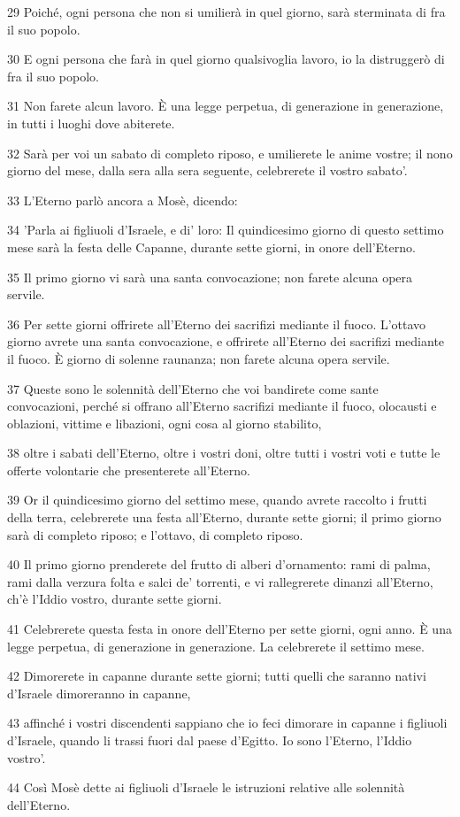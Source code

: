 \par 29 Poiché, ogni persona che non si umilierà in quel giorno, sarà sterminata di fra il suo popolo.
\par 30 E ogni persona che farà in quel giorno qualsivoglia lavoro, io la distruggerò di fra il suo popolo.
\par 31 Non farete alcun lavoro. È una legge perpetua, di generazione in generazione, in tutti i luoghi dove abiterete.
\par 32 Sarà per voi un sabato di completo riposo, e umilierete le anime vostre; il nono giorno del mese, dalla sera alla sera seguente, celebrerete il vostro sabato'.
\par 33 L'Eterno parlò ancora a Mosè, dicendo:
\par 34 'Parla ai figliuoli d'Israele, e di' loro: Il quindicesimo giorno di questo settimo mese sarà la festa delle Capanne, durante sette giorni, in onore dell'Eterno.
\par 35 Il primo giorno vi sarà una santa convocazione; non farete alcuna opera servile.
\par 36 Per sette giorni offrirete all'Eterno dei sacrifizi mediante il fuoco. L'ottavo giorno avrete una santa convocazione, e offrirete all'Eterno dei sacrifizi mediante il fuoco. È giorno di solenne raunanza; non farete alcuna opera servile.
\par 37 Queste sono le solennità dell'Eterno che voi bandirete come sante convocazioni, perché si offrano all'Eterno sacrifizi mediante il fuoco, olocausti e oblazioni, vittime e libazioni, ogni cosa al giorno stabilito,
\par 38 oltre i sabati dell'Eterno, oltre i vostri doni, oltre tutti i vostri voti e tutte le offerte volontarie che presenterete all'Eterno.
\par 39 Or il quindicesimo giorno del settimo mese, quando avrete raccolto i frutti della terra, celebrerete una festa all'Eterno, durante sette giorni; il primo giorno sarà di completo riposo; e l'ottavo, di completo riposo.
\par 40 Il primo giorno prenderete del frutto di alberi d'ornamento: rami di palma, rami dalla verzura folta e salci de' torrenti, e vi rallegrerete dinanzi all'Eterno, ch'è l'Iddio vostro, durante sette giorni.
\par 41 Celebrerete questa festa in onore dell'Eterno per sette giorni, ogni anno. È una legge perpetua, di generazione in generazione. La celebrerete il settimo mese.
\par 42 Dimorerete in capanne durante sette giorni; tutti quelli che saranno nativi d'Israele dimoreranno in capanne,
\par 43 affinché i vostri discendenti sappiano che io feci dimorare in capanne i figliuoli d'Israele, quando li trassi fuori dal paese d'Egitto. Io sono l'Eterno, l'Iddio vostro'.
\par 44 Così Mosè dette ai figliuoli d'Israele le istruzioni relative alle solennità dell'Eterno.

